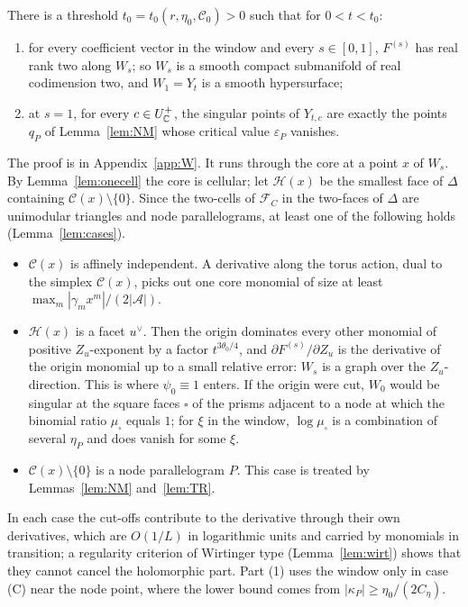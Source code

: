 \begin{lemma}\label{lem:W}
There is a threshold $t_0=t_0(r,\eta_0,\mathscr C_0)>0$ such that for $0<t<t_0$:
\begin{enumerate}
\item for every coefficient vector in the window and every $s\in[0,1]$, $F^{(s)}$ has real rank two along $W_s$; so
$W_s$ is a smooth compact submanifold of real codimension two, and $W_1=Y_t$ is a smooth hypersurface;
\item at $s=1$, for every $c\in U^+_\mathbb C$, the singular points of $Y_{t,c}$ are exactly the points $q_P$ of
Lemma~\ref{lem:NM} whose critical value $\varepsilon_P$ vanishes.
\end{enumerate}
\end{lemma}

The proof is in Appendix~\ref{app:W}. It runs through the core at a point $x$ of $W_s$. By Lemma~\ref{lem:onecell} the
core is cellular; let $\mathcal H(x)$ be the smallest face of $\Delta$ containing $\mathcal C(x)\setminus\{0\}$. Since the
two-cells of $\mathcal F_C$ in the two-faces of $\Delta$ are unimodular triangles and node parallelograms, at least one of
the following holds (Lemma~\ref{lem:cases}).
\begin{itemize}
\item[(A)] $\mathcal C(x)$ is affinely independent. A derivative along the torus action, dual to the simplex
$\mathcal C(x)$, picks out one core monomial of size at least $\max_m|\gamma_mx^m|/(2|\mathcal A|)$.
\item[(B)] $\mathcal H(x)$ is a facet $u^\vee$. Then the origin dominates every other monomial of positive $Z_u$-exponent
by a factor $t^{3\theta_0/4}$, and $\partial F^{(s)}/\partial Z_u$ is the derivative of the origin monomial up to a small
relative error: $W_s$ is a graph over the $Z_u$-direction. This is where $\psi_0\equiv1$ enters. If the origin were
cut, $W_0$ would be singular at the square faces $\square$ of the prisms adjacent to a node at which the binomial ratio
$\mu_\square$ equals $1$; for $\xi$ in the window, $\log\mu_\square$ is a combination of several $\eta_P$ and does vanish
for some $\xi$.
\item[(C)] $\mathcal C(x)\setminus\{0\}$ is a node parallelogram $P$. This case is treated by Lemmas~\ref{lem:NM}
and~\ref{lem:TR}.
\end{itemize}
In each case the cut-offs contribute to the derivative through their own derivatives, which are $O(1/L)$ in
logarithmic units and carried by monomials in transition; a regularity criterion of Wirtinger type
(Lemma~\ref{lem:wirt}) shows that they cannot cancel the holomorphic part. Part (1) uses the window only in case (C)
near the node point, where the lower bound comes from $|\kappa_P|\ge\eta_0/(2C_\eta)$.

